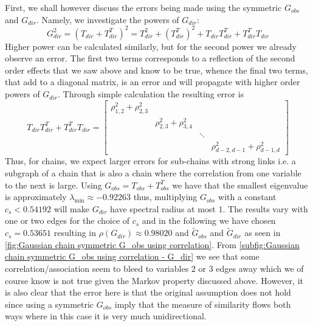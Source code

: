 \documentclass[../Thesis.tex]{subfiles}
\begin{document}
First, we shall however discuss the errors being made using the symmetric $G_{obs}$ and $G_{dir}$. Namely, we investigate the powers of $G_{dir}$:
$$G_{dir}^2 = \left(T_{dir} + T_{dir}^T\right)^2 = T_{dir}^2 + \left(T_{dir}^T\right)^2 + T_{dir} T_{dir}^T + T_{dir}^T T_{dir}$$
Higher power can be calculated similarly, but for the second power we already observe an error. The first two terms corresponds to a reflection of the second order effects that we saw above and know to be true, whence the final two terms, that add to a diagonal matrix, is an error and will propagate with higher order powers of $G_{dir}$. Through simple calculation the resulting error is
$$T_{dir} T_{dir}^T + T_{dir}^T T_{dir} = \begin{bmatrix}
        \rho_{1,2}^2 + \rho_{2,3}^2 &                             &        & \\
                                    & \rho_{2,3}^2 + \rho_{3,4}^2 &        & \\
                                    &                             & \ddots & \\
                                    &   &   & \rho_{d-2,d-1}^2 + \rho_{d-1,d}^2
    \end{bmatrix}$$
Thus, for chains, we expect larger errors for sub-chains with strong links i.e. a subgraph of a chain that is also a chain where the correlation from one variable to the next is large. Using $G_{obs} = T_{obs} + T_{obs}^T$ we have that the smallest eigenvalue is approximately $\lambda_{\min} \approx -0.92263$ thus, multiplying $G_{obs}$ with a constant $c_s < 0.54192$ will make $G_{dir}$ have spectral radius at most $1$. The results vary with one or two edges for the choice of $c_s$ and in the following we have chosen $c_s = 0.53651$ resulting in $\rho\left(G_{dir}\right) \approx 0.98020$ and $\tilde{G}_{obs}$ and $\tilde{G}_{dir}$ as seen in \autoref{fig:Gaussian chain symmetric G_obs using correlation}. From \autoref{subfig:Gaussian chain symmetric G_obs using correlation - G_dir} we see that some correlation/association seem to bleed to variables $2$ or $3$ edges away which we of course know is not true given the Markov property discussed above. However, it is also clear that the error here is that the original assumption does not hold since using a symmetric $G_{obs}$ imply that the measure of similarity flows both ways where in this case it is very much unidirectional.
\end{document}
